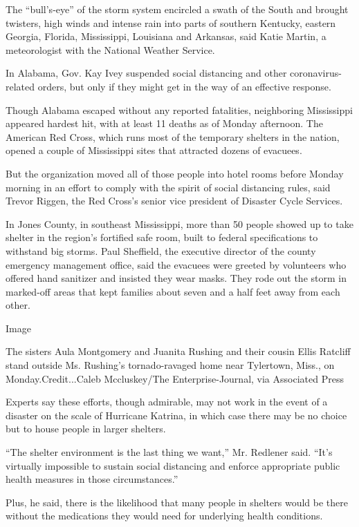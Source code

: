 The ``bull's-eye'' of the storm system encircled a swath of the South
and brought twisters, high winds and intense rain into parts of southern
Kentucky, eastern Georgia, Florida, Mississippi, Louisiana and Arkansas,
said Katie Martin, a meteorologist with the National Weather Service.

In Alabama, Gov. Kay Ivey suspended social distancing and other
coronavirus-related orders, but only if they might get in the way of an
effective response.

Though Alabama escaped without any reported fatalities, neighboring
Mississippi appeared hardest hit, with at least 11 deaths as of Monday
afternoon. The American Red Cross, which runs most of the temporary
shelters in the nation, opened a couple of Mississippi sites that
attracted dozens of evacuees.

But the organization moved all of those people into hotel rooms before
Monday morning in an effort to comply with the spirit of social
distancing rules, said Trevor Riggen, the Red Cross's senior vice
president of Disaster Cycle Services.

In Jones County, in southeast Mississippi, more than 50 people showed up
to take shelter in the region's fortified safe room, built to federal
specifications to withstand big storms. Paul Sheffield, the executive
director of the county emergency management office, said the evacuees
were greeted by volunteers who offered hand sanitizer and insisted they
wear masks. They rode out the storm in marked-off areas that kept
families about seven and a half feet away from each other.

Image

The sisters Aula Montgomery and Juanita Rushing and their cousin Ellis
Ratcliff stand outside Ms. Rushing's tornado-ravaged home near
Tylertown, Miss., on Monday.Credit...Caleb Mccluskey/The
Enterprise-Journal, via Associated Press

Experts say these efforts, though admirable, may not work in the event
of a disaster on the scale of Hurricane Katrina, in which case there may
be no choice but to house people in larger shelters.

``The shelter environment is the last thing we want,'' Mr. Redlener
said. ``It's virtually impossible to sustain social distancing and
enforce appropriate public health measures in those circumstances.''

Plus, he said, there is the likelihood that many people in shelters
would be there without the medications they would need for underlying
health conditions.

